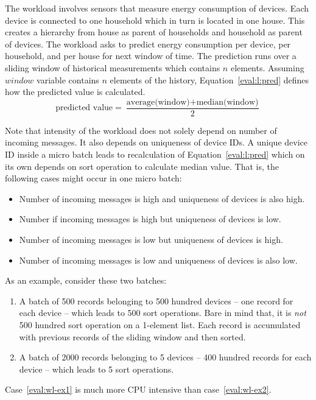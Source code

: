 The workload involves sensors that measure energy consumption of devices. Each device is connected to one household which in turn is located in one house. This creates a hierarchy from house as parent of households and household as parent of devices. The workload asks to predict energy consumption per device, per household, and per house  for next window of time. The prediction runs over a sliding window of historical measurements which contains $n$ elements. Assuming $window$ variable contains $n$ elements of the history, Equation~\ref{eval:l:pred} defines how the predicted value is calculated.
\begin{equation}
\text{predicted value} = \frac{\text{average(window)} + \text{median(window)}}{2}
\label{eval:l:pred}
\end{equation}

Note that intensity of the workload does not solely depend on number of incoming messages. It also depends on uniqueness of device IDs. A unique device ID inside a micro batch leads to recalculation of Equation~\ref{eval:l:pred} which on its own depends on sort operation to calculate median value. That is, the following cases might occur in one micro batch:
\begin{itemize}
    \item Number of incoming messages is high and uniqueness of devices is also high.
    \item Number if incoming messages is high but uniqueness of devices is low.
    \item Number of incoming messages is low but uniqueness of devices is high.
    \item Number of incoming messages is low and uniqueness of devices is also low.
\end{itemize}
As an example, consider these two batches:
\begin{enumerate}
    \item \label{eval:wl-ex1} A batch of 500 records belonging to 500 hundred devices -- one record for each device -- which leads to 500 sort operations. Bare in mind that, it is \emph{not} 500 hundred sort operation on a 1-element list. Each record is accumulated with previous records of the sliding window and then sorted.
    \item \label{eval:wl-ex2} A batch of 2000 records belonging to 5 devices -- 400 hundred records for each device -- which leads to 5 sort operations.
\end{enumerate}
Case~\ref{eval:wl-ex1} is much more CPU intensive than case~\ref{eval:wl-ex2}.

